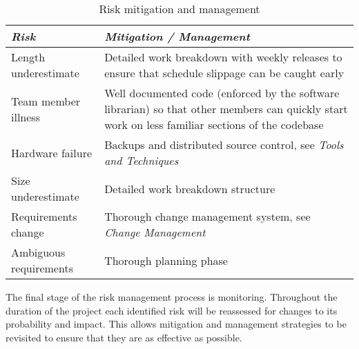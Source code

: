 \begin{table*}
	\small
	\begin{tabular}{l p{37em}}
		\toprule
		\emph{Risk} & \emph{Mitigation / Management} \\
		\midrule
		Length underestimate & Detailed work breakdown with weekly releases to ensure that
			schedule slippage can be caught early \\
		Team member illness & Well documented code (enforced by the software librarian) so
			that other members can quickly start work on less familiar sections of
			the codebase \\
		Hardware failure & Backups and distributed source control, see \emph{Tools and Techniques} \\
		Size underestimate & Detailed work breakdown structure \\
		Requirements change & Thorough change management system, see \emph{Change Management} \\
		Ambiguous requirements & Thorough planning phase \\
		\bottomrule
	\end{tabular}
	\vspace{1.5em}
	\caption{Risk mitigation and management}
	\label{tab:rmm}
\end{table*}

The final stage of the risk management process is monitoring. Throughout the duration of
the project each identified risk will be reassessed for changes to its probability and
impact. This allows mitigation and management strategies to be revisited to ensure that
they are as effective as possible.
